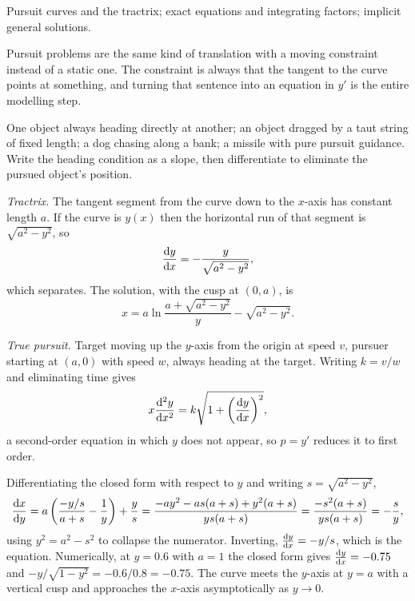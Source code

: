 \begin{seealsob}Pursuit curves and the tractrix; exact equations and integrating factors; implicit general solutions.\end{seealsob}

Pursuit problems are the same kind of translation with a moving constraint instead of a static one. The constraint is always that the tangent to the curve points at something, and turning that sentence into an equation in $y'$ is the entire modelling step.

\cue One object always heading directly at another; an object dragged by a taut string of fixed length; a dog chasing along a bank; a missile with pure pursuit guidance.
\method Write the heading condition as a slope, then differentiate to eliminate the pursued object's position.

\emph{Tractrix.} The tangent segment from the curve down to the $x$-axis has constant length $a$. If the curve is $y(x)$ then the horizontal run of that segment is $\sqrt{a^{2}-y^{2}}$, so
\[\frac{\mathrm{d}y}{\mathrm{d}x}=-\frac{y}{\sqrt{a^{2}-y^{2}}},\]
which separates. The solution, with the cusp at $(0,a)$, is
\[x=a\ln\frac{a+\sqrt{a^{2}-y^{2}}}{y}-\sqrt{a^{2}-y^{2}}.\]

\emph{True pursuit.} Target moving up the $y$-axis from the origin at speed $v$, pursuer starting at $(a,0)$ with speed $w$, always heading at the target. Writing $k=v/w$ and eliminating time gives
\[x\frac{\mathrm{d}^{2}y}{\mathrm{d}x^{2}}=k\sqrt{1+\left(\frac{\mathrm{d}y}{\mathrm{d}x}\right)^{2}},\]
a second-order equation in which $y$ does not appear, so $p=y'$ reduces it to first order.

\begin{worked}
Differentiating the closed form with respect to $y$ and writing $s=\sqrt{a^{2}-y^{2}}$,
\[\frac{\mathrm{d}x}{\mathrm{d}y}=a\left(\frac{-y/s}{a+s}-\frac1y\right)+\frac ys=\frac{-ay^{2}-as(a+s)+y^{2}(a+s)}{ys(a+s)}=\frac{-s^{2}(a+s)}{ys(a+s)}=-\frac sy,\]
using $y^{2}=a^{2}-s^{2}$ to collapse the numerator. Inverting, $\frac{\mathrm{d}y}{\mathrm{d}x}=-y/s$, which is the equation. Numerically, at $y=0.6$ with $a=1$ the closed form gives $\frac{\mathrm{d}y}{\mathrm{d}x}=-0.75$ and $-y/\sqrt{1-y^{2}}=-0.6/0.8=-0.75$. The curve meets the $y$-axis at $y=a$ with a vertical cusp and approaches the $x$-axis asymptotically as $y\to0$.
\end{worked}

